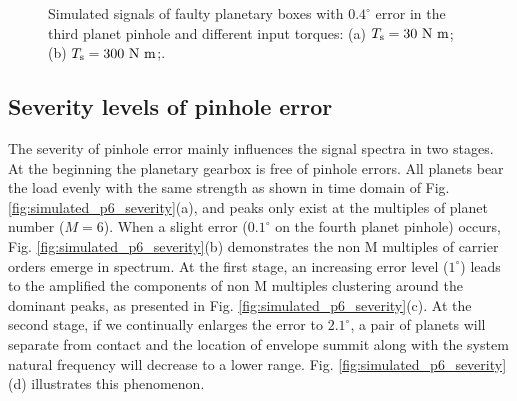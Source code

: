 \documentclass[a4paper,fleqn]{cas-sc}%
\begin{document}
\begin{figure}[pos=htbp]
    \caption{Simulated signals of faulty planetary boxes with $0.4^\circ$ error in the third planet pinhole and different input torques: (a) $T_{\rm s}=30\ {\rm N\ m}$; (b) $T_{\rm s}=300\ {\rm N\ m}$;.}
    \label{fig:simulated_p5_fault}
\end{figure}
\subsection{Severity levels of pinhole error}
\par The severity of pinhole error mainly influences the signal spectra in two stages. At the beginning the planetary gearbox is free of pinhole errors. All planets bear the load evenly with the same strength as shown in time domain of Fig. \ref{fig:simulated_p6_severity}(a), and peaks only exist at the multiples of planet number ($M=6$). When a slight error ($0.1^\circ$ on the fourth planet pinhole) occurs, Fig. \ref{fig:simulated_p6_severity}(b) demonstrates the non M multiples of carrier orders emerge in spectrum.  At the first stage, an increasing error level ($1^\circ$) leads to the amplified the components of non M multiples clustering around the dominant peaks, as presented in Fig. \ref{fig:simulated_p6_severity}(c). At the second stage, if we continually enlarges the error to $2.1^\circ$, a pair of planets will separate from contact and the location of envelope summit along with the system natural frequency will decrease to a lower range. Fig. \ref{fig:simulated_p6_severity}(d) illustrates this phenomenon.
\end{document}
